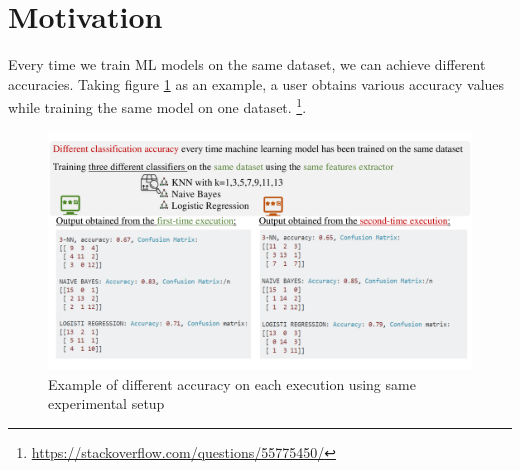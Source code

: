 \section{Motivation}
\label{sec:motivation}
Every time we train ML models on the same dataset, we can achieve different accuracies. Taking figure \ref{fig:motiv} as an example, a user obtains various accuracy values while training the same model on one dataset. \footnote{\small \url{https://stackoverflow.com/questions/55775450/}}.
\begin{figure}[h]
	\includegraphics[width=\linewidth]{motivfigure.pdf}
	\caption{Example of different accuracy on each execution using same experimental setup}
	\label{fig:motiv}
\end{figure}

